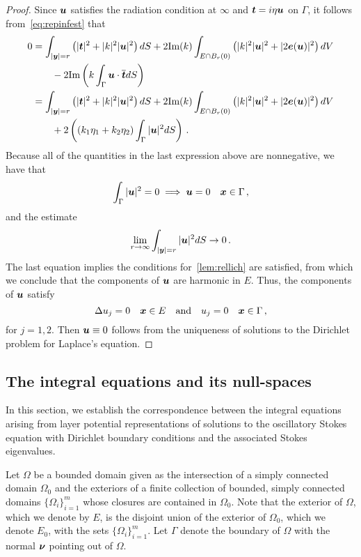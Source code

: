 \begin{proof}
Since ${\boldsymbol u}$ satisfies the radiation condition at $\infty$ and ${\boldsymbol t} = i\eta {\boldsymbol u}$
on $\Gamma$, it follows from~\cref{eq:repinfest} that
\begin{align*}
0 &=
\int_{|{\boldsymbol y}|=r} \left( |{\boldsymbol t}|^2 + |k|^2 |{\boldsymbol u}|^2 \right) dS +
2 \text{Im}(k) \int_{E \cap B_{r}(0)} \left(|k|^2 |{\boldsymbol u}|^2 + |2{\boldsymbol e}({\boldsymbol u})|^2 \right)
dV \nonumber \\
& \qquad - 2 \text{Im} \left( k \int_{\Gamma} {\boldsymbol u} \cdot \overline{{\boldsymbol t}} dS  \right) \\
&= 
\int_{|{\boldsymbol y}|=r} \left( |{\boldsymbol t}|^2 + |k|^2 |{\boldsymbol u}|^2 \right) dS +
2 \text{Im}(k) \int_{E \cap B_{r}(0)} \left(|k|^2 |{\boldsymbol u}|^2 + |2{\boldsymbol e}({\boldsymbol u})|^2 \right)
dV \nonumber \\
& \qquad + 2 \left( (k_{1}\eta_{1} + k_{2}\eta_{2}) \int_{\Gamma} |{\boldsymbol u}|^{2} dS  \right)
\, .
\end{align*}
Because all of the quantities in the last expression above are
nonnegative, we have that
\begin{equation}
  \int_{\Gamma} |{\boldsymbol u}|^{2} = 0 \implies {\boldsymbol u} = 0  \quad {\boldsymbol x} \in \Gamma \, ,
  \nonumber
\end{equation}
and the estimate
\begin{equation}
\lim_{r\to\infty} \int_{|{\boldsymbol y}|=r} |{\boldsymbol u}|^{2} dS \to 0 \, . \nonumber
\end{equation}
The last equation implies the conditions for~\cref{lem:rellich}
are satisfied, from which we conclude that the components
of ${\boldsymbol u}$ are harmonic in $E$. 
Thus, the components of ${\boldsymbol u}$ satisfy
\begin{equation}
\Delta u_{j}=  0 \quad {\boldsymbol x} \in E \quad \text{and} \quad
u_{j} = 0 \quad {\boldsymbol x} \in \Gamma \, , \nonumber
\end{equation}
for $j=1,2$.
Then ${\boldsymbol u} \equiv 0$ follows from the uniqueness of solutions to the 
Dirichlet problem for Laplace's equation.
\end{proof}

\subsection{The integral equations and its null-spaces}

In this section, we establish the correspondence between the
integral equations arising from layer potential representations
of solutions to the oscillatory Stokes equation with Dirichlet 
boundary conditions and the associated Stokes eigenvalues.

Let $\Omega$ be a bounded domain given as
the intersection of a simply connected domain $\Omega_0$ and
the exteriors of a finite collection of bounded,
simply connected domains $\{ \Omega_i \}_{i=1}^m$
whose closures are contained in $\Omega_0$. Note that the
exterior of $\Omega$, which we denote by $E$, is the
disjoint union of the exterior of $\Omega_0$, which we
denote $E_0$, with the sets $\{ \Omega_i \}_{i=1}^m$.
Let $\Gamma$ denote the boundary of $\Omega$ with the normal
${\boldsymbol \nu}$ pointing out of $\Omega$.

